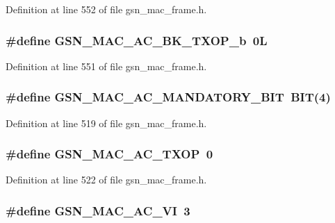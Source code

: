 Definition at line 552 of file gsn\_\-mac\_\-frame.h.

\hypertarget{a00523_aa051a861f0bd8289e4529858c66e7ef5}{
\subsubsection[{GSN\_\-MAC\_\-AC\_\-BK\_\-TXOP\_\-b}]{\setlength{\rightskip}{0pt plus 5cm}\#define GSN\_\-MAC\_\-AC\_\-BK\_\-TXOP\_\-b~0L}}
\label{a00523_aa051a861f0bd8289e4529858c66e7ef5}


Definition at line 551 of file gsn\_\-mac\_\-frame.h.

\hypertarget{a00523_a1c71cb54172b199e60a9a3b0da640ab7}{
\subsubsection[{GSN\_\-MAC\_\-AC\_\-MANDATORY\_\-BIT}]{\setlength{\rightskip}{0pt plus 5cm}\#define GSN\_\-MAC\_\-AC\_\-MANDATORY\_\-BIT~BIT(4)}}
\label{a00523_a1c71cb54172b199e60a9a3b0da640ab7}


Definition at line 519 of file gsn\_\-mac\_\-frame.h.

\hypertarget{a00523_a7cffb6f566c0d5eec41b1435c9bd6756}{
\subsubsection[{GSN\_\-MAC\_\-AC\_\-TXOP}]{\setlength{\rightskip}{0pt plus 5cm}\#define GSN\_\-MAC\_\-AC\_\-TXOP~0}}
\label{a00523_a7cffb6f566c0d5eec41b1435c9bd6756}


Definition at line 522 of file gsn\_\-mac\_\-frame.h.

\hypertarget{a00523_a775e02e6af349e7e9e68c9ecd31b0ced}{
\subsubsection[{GSN\_\-MAC\_\-AC\_\-VI}]{\setlength{\rightskip}{0pt plus 5cm}\#define GSN\_\-MAC\_\-AC\_\-VI~3}}
\label{a00523_a775e02e6af349e7e9e68c9ecd31b0ced}


